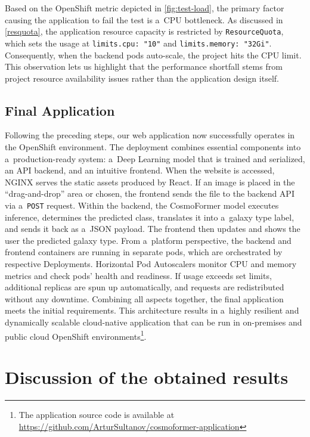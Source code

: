 Based on the OpenShift metric depicted in \autoref{fig:test-load}, the primary factor causing the application to fail the test is a~CPU bottleneck. As discussed in \autoref{resquota}, the application resource capacity is restricted by \texttt{ResourceQuota}, which sets the usage at \texttt{limits.cpu: "10"} and \texttt{limits.memory: "32Gi"}. Consequently, when the backend pods auto-scale, the project hits the CPU limit. This observation lets us highlight that the performance shortfall stems from project resource availability issues rather than the application design itself.

\section*{Final Application}

Following the preceding steps, our web application now successfully operates in the OpenShift environment. The deployment combines essential components into a~production-ready system: a~Deep Learning model that is trained and serialized, an API backend, and an intuitive frontend. When the website is accessed, NGINX serves the static assets produced by React. If an image is placed in the \enquote{drag-and-drop} area or chosen, the frontend sends the file to the backend API via a~\texttt{POST} request. Within the backend, the CosmoFormer model executes inference, determines the predicted class, translates it into a~galaxy type label, and sends it back as a~JSON payload. The frontend then updates and shows the user the predicted galaxy type. From a~platform perspective, the backend and frontend containers are running in separate pods, which are orchestrated by respective Deployments. Horizontal Pod Autoscalers monitor CPU and memory metrics and check pods' health and readiness. If usage exceeds set limits, additional replicas are spun up automatically, and requests are redistributed without any downtime. Combining all aspects together, the final application meets the initial requirements. This architecture results in a~highly resilient and dynamically scalable cloud-native application that can be run in on-premises and public cloud OpenShift environments\footnote{The application source code is available at \url{https://github.com/ArturSultanov/cosmoformer-application}}.

\chapter{Discussion of the obtained results}

